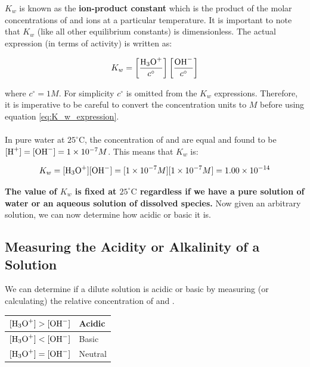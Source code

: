 \documentclass[12pt]{article}
\newcommand\T{\rule{0pt}{5.0ex}}       %
\newcommand\B{\rule[-4.0ex]{0pt}{0pt}} %
\begin{document}
\noindent  $K_{w}$ is known as the \textbf{ion-product constant} which is the product of the molar concentrations of  and  ions at a particular temperature. It is important to note that $K_{w}$ (like all other equilibrium constants) is dimensionless. The actual expression (in terms of activity) is written as:

\begin{equation}
    K_{w} = \left[\frac{\ce{H3O+}}{c^{\circ}}\right]\left[\frac{\ce{OH-}}{c^{\circ}}\right]
\end{equation}

\noindent where $c^{\circ} = 1 M$. For simplicity $c^{\circ}$ is omitted from the $K_{w}$ expressions. Therefore, it is imperative to be careful to convert the concentration units to $M$ before using equation \ref{eq:K_w_expression}.
\\
\\
\noindent In pure water at $25^{\circ}\text{C}$, the concentration of  and  are equal and found to be $[\ce{H+}] = [\ce{OH-}] = 1 \times 10^{-7} M$. This means that $K_{w}$ is:

\begin{equation}
    K_{w} = [\ce{H3O+}][\ce{OH-}] = [1 \times 10^{-7} M][1 \times 10^{-7} M] = 1.00 \times 10^{-14}
\end{equation}

\noindent \textbf{The value of $K_{w}$ is fixed at $25^{\circ}\text{C}$ regardless if we have a pure solution of water or an aqueous solution of dissolved species.} Now given an arbitrary solution, we can now determine how acidic or basic it is.

\subsection{Measuring the Acidity or Alkalinity of a Solution}

\noindent We can determine if a dilute solution is acidic or basic by measuring (or calculating) the relative concentration of  and .

\begin{center}
\begin{tabularx}{0.8\textwidth}{| >{\centering\arraybackslash}X | >{\centering\arraybackslash}X | }
    \hline
    $[\ce{H3O+}] > [\ce{OH-}]$ & Acidic  \T\B \\
    \hline
    $[\ce{H3O+}] < [\ce{OH-}]$ & Basic  \T\B \\
    \hline
    $[\ce{H3O+}] = [\ce{OH-}]$ & Neutral  \T\B \\
    \hline
\end{tabularx}
\end{center}
\end{document}
